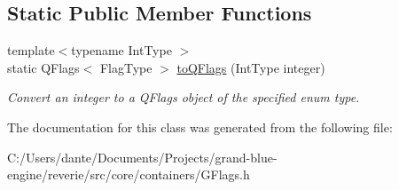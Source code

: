 \subsection*{Static Public Member Functions}
\begin{DoxyCompactItemize}
\item 
\mbox{\label{classrev_1_1_flags_a958f86d42a1e07f6325dab98e53a600d}} 
{\footnotesize template$<$typename Int\+Type $>$ }\\static Q\+Flags$<$ Flag\+Type $>$ \mbox{\hyperlink{classrev_1_1_flags_a958f86d42a1e07f6325dab98e53a600d}{to\+Q\+Flags}} (Int\+Type integer)
\begin{DoxyCompactList}\small\item\em Convert an integer to a Q\+Flags object of the specified enum type. \end{DoxyCompactList}\end{DoxyCompactItemize}


The documentation for this class was generated from the following file\+:\begin{DoxyCompactItemize}
\item 
C\+:/\+Users/dante/\+Documents/\+Projects/grand-\/blue-\/engine/reverie/src/core/containers/G\+Flags.\+h\end{DoxyCompactItemize}

